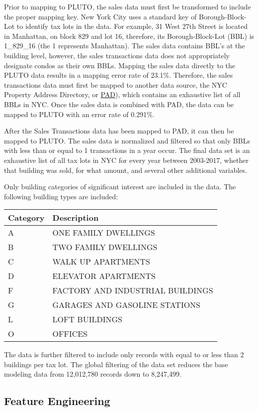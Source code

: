 \documentclass[]{article}
\begin{document}
Prior to mapping to PLUTO, the sales data must first be transformed to
include the proper mapping key. New York City uses a standard key of
Borough-Block-Lot to identify tax lots in the data. For example, 31 West
27th Street is located in Manhattan, on block 829 and lot 16, therefore,
its Borough-Block-Lot (BBL) is 1\_829\_16 (the 1 represents Manhattan).
The sales data contains BBL's at the building level, however, the sales
transactions data does not appropriately designate condos as their own
BBLs. Mapping the sales data directly to the PLUTO data results in a
mapping error rate of 23.1\%. Therefore, the sales transactions data
must first be mapped to another data source, the NYC Property Address
Directory, or
\href{https://data.cityofnewyork.us/City-Government/Property-Address-Directory/bc8t-ecyu/data}{PAD}),
which contains an exhaustive list of all BBLs in NYC. Once the sales
data is combined with PAD, the data can be mapped to PLUTO with an error
rate of 0.291\%.

After the Sales Transactions data has been mapped to PAD, it can then be
mapped to PLUTO. The sales data is normalized and filtered so that only
BBLs with less than or equal to 1 transactions in a year occur. The
final data set is an exhaustive list of all tax lots in NYC for every
year between 2003-2017, whether that building was sold, for what amount,
and several other additional variables.

Only building categories of significant interest are included in the
data. The following building types are included:

\begin{longtable}[]{@{}ll@{}}
\toprule
Category & Description\tabularnewline
\midrule
\endhead
A & ONE FAMILY DWELLINGS\tabularnewline
B & TWO FAMILY DWELLINGS\tabularnewline
C & WALK UP APARTMENTS\tabularnewline
D & ELEVATOR APARTMENTS\tabularnewline
F & FACTORY AND INDUSTRIAL BUILDINGS\tabularnewline
G & GARAGES AND GASOLINE STATIONS\tabularnewline
L & LOFT BUILDINGS\tabularnewline
O & OFFICES\tabularnewline
\bottomrule
\end{longtable}

The data is further filtered to include only records with equal to or
less than 2 buildings per tax lot. The global filtering of the data set
reduces the base modeling data from 12,012,780 records down to
8,247,499.

\subsection{Feature Engineering}\label{feature-engineering}
\end{document}
